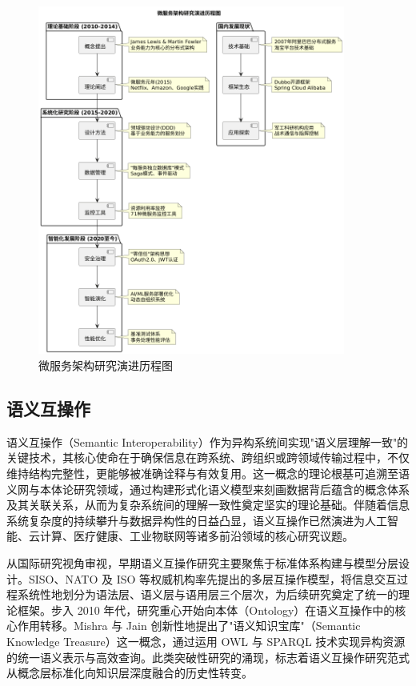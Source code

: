 \begin{figure}[H]
    \centering
    \includegraphics[width=0.9\textwidth,height=0.6\textheight,keepaspectratio]{chapters/fig-0/microservices_research_evolution.png}
    \caption{微服务架构研究演进历程图}
    \label{fig_microservices_research_evolution}
\end{figure}


\subsection{语义互操作}

语义互操作（Semantic Interoperability）作为异构系统间实现"语义层理解一致"的关键技术，其核心使命在于确保信息在跨系统、跨组织或跨领域传输过程中，不仅维持结构完整性，更能够被准确诠释与有效复用。这一概念的理论根基可追溯至语义网与本体论研究领域，通过构建形式化语义模型来刻画数据背后蕴含的概念体系及其关联关系，从而为复杂系统间的理解一致性奠定坚实的理论基础。伴随着信息系统复杂度的持续攀升与数据异构性的日益凸显，语义互操作已然演进为人工智能、云计算、医疗健康、工业物联网等诸多前沿领域的核心研究议题。

从国际研究视角审视，早期语义互操作研究主要聚焦于标准体系构建与模型分层设计。SISO、NATO 及 ISO 等权威机构率先提出的多层互操作模型，将信息交互过程系统性地划分为语法层、语义层与语用层三个层次\cite{SISO_STD_002_2006,CJCSI_6610_01F_2021}，为后续研究奠定了统一的理论框架。步入 2010 年代，研究重心开始向本体（Ontology）在语义互操作中的核心作用转移。Mishra 与 Jain 创新性地提出了"语义知识宝库"（Semantic Knowledge Treasure）这一概念，通过运用 OWL 与 SPARQL 技术实现异构资源的统一语义表示与高效查询\cite{Mishra2018Semantic}。此类突破性研究的涌现，标志着语义互操作研究范式从概念层标准化向知识层深度融合的历史性转变。


